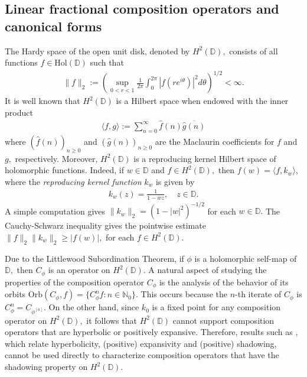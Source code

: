 \documentclass[11pt]{amsart}
\theoremstyle{plain}
\theoremstyle{remark}
\theoremstyle{plain}
\begin{document}
\subsection{Linear fractional composition operators and canonical forms} 


The Hardy space of the open unit disk, denoted by $H^2(\mathbb{D}),$ consists of all functions $f\in \mathrm{Hol}(\mathbb{D})$ such that
\begin{align*}
\|f\|_2:= \left(\sup_{0 < r < 1} \frac{1}{2\pi} \int_{0}^{2\pi} |f(re^{i \theta} )|^2 d\theta\right)^{1/2}<\infty. 
\end{align*}
It is well known that $H^2(\mathbb{D})$ is a Hilbert space when endowed with the inner product 
\begin{align*}
\langle f, g\rangle:=\sum_{n=0}^\infty\widehat{f}(n)\overline{\widehat{g}(n)}
\end{align*}
where $(\widehat{f}(n))_{n \geq 0}$ and $(\widehat{g}(n))_{n \geq 0}$ are the Maclaurin coefficients for $f$ and $g,$ respectively. Moreover, $H^2(\mathbb{D})$ is a reproducing kernel Hilbert space of holomorphic functions. Indeed, if $w\in \mathbb{D}$ and $f\in H^2(\mathbb{D}),$ then $f(w)=\langle f, k_w\rangle$, where the \textit{reproducing kernel function} $k_w$ is given by 
\begin{align*}
k_w(z)=\frac{1}{1-\overline{w}z}, \quad z\in \mathbb{D}.
\end{align*}
A simple computation gives $\|k_w\|_2=(1-|w|^2)^{-1/2}$ for each $w\in \mathbb{D}.$ The Cauchy-Schwarz inequality gives the pointwise estimate
$\|f\|_2\|k_w\|_2\geq |f(w)|,$  for each $f\in H^2(\mathbb{D}).$ 

Due to the Littlewood Subordination Theorem, if $\phi$ is a holomorphic self-map of $\mathbb{D},$ then $C_{\phi}$ is an operator on $H^2(\mathbb{D}).$ A natural aspect of studying the properties of the composition operator $C_{\phi}$ is the analysis of the behavior of its orbits $\mathrm{Orb}(C_{\phi},f)=\{C_{\phi}^nf:n\in \mathbb{N}_0\}$. This occurs because the $n$-th iterate of $C_{\phi}$ is $C_{\phi}^n=C_{\phi^{[n]}}.$ On the other hand, since $k_0$ is a fixed point for any composition operator on $H^2(\mathbb{D}),$ it follows that $H^2(\mathbb{D})$ cannot support composition operators that are hyperbolic or positively expansive. Therefore, results such as \cite[Theorem 1 and Proposition 5]{Bernardes_Messaoudi_shadowingprincipal}, which relate hyperbolicity, (positive) expansivity and (positive) shadowing, cannot be used directly to characterize composition operators that have the shadowing property on $H^2(\mathbb{D})$.
\end{document}
